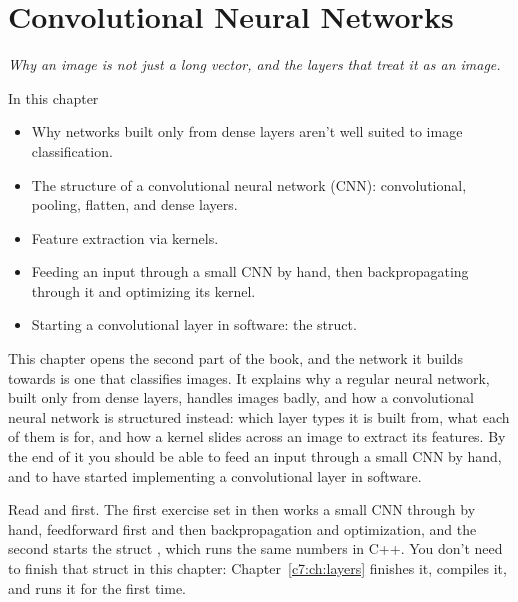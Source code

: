 
\chapter{Convolutional Neural Networks}
\label{c6:ch:cnn}

{\large\itshape Why an image is not just a long vector, and the layers that treat it as an
image.\par}

\begin{chapterbox}{In this chapter}
\begin{itemize}
  \item Why networks built only from dense layers aren't well suited to image classification.
  \item The structure of a convolutional neural network (CNN): convolutional, pooling, flatten,
    and dense layers.
  \item Feature extraction via kernels.
  \item Feeding an input through a small CNN by hand, then backpropagating through it and
    optimizing its kernel.
  \item Starting a convolutional layer in software: the  struct.
\end{itemize}
\end{chapterbox}

This chapter opens the second part of the book, and the network it builds towards is one that
classifies images. It explains why a regular neural network, built only from dense layers, handles
images badly, and how a convolutional neural network is structured instead: which layer types it
is built from, what each of them is for, and how a kernel slides across an image to extract its
features. By the end of it you should be able to feed an input through a small CNN by hand, and to
have started implementing a convolutional layer in software.

Read  and  first. The first exercise set in
 then works a small CNN through by hand, feedforward first and then
backpropagation and optimization, and the second starts the struct , which runs
the same numbers in C++. You don't need to finish that struct in this chapter:
Chapter~\ref{c7:ch:layers} finishes it, compiles it, and runs it for the first time.




